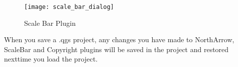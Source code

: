 \begin{figure}[ht]
   \centering
   \texttt{[image: scale\_bar\_dialog]}
   \caption{Scale Bar Plugin \nixcaption}\label{fig:scale_bar}
\end{figure}

\begin{Tip}\caption{\textsc{Plugins Settings Saved to Project}}
When you save a .qgs project, any changes you have made to NorthArrow, ScaleBar and Copyright plugins will be saved in the project and restored nexttime you load the project.
\end{Tip}

\FloatBarrier
